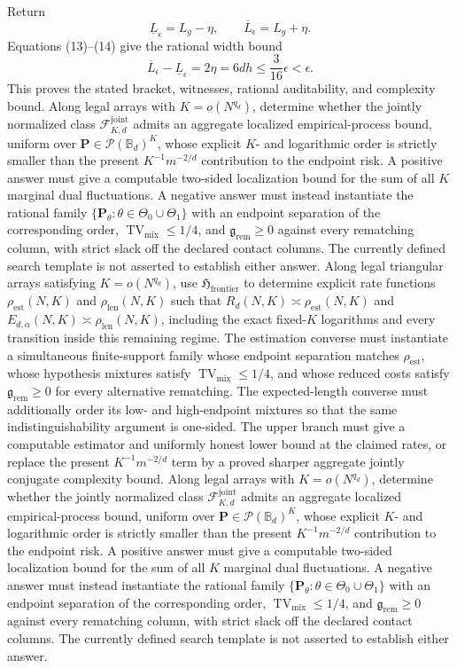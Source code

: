 Return
\[
\underline L_\epsilon=L_g-\eta,
\qquad
\overline L_\epsilon=L_g+\eta.
\]
Equations (13)--(14) give the rational width bound
\[
\overline L_\epsilon-\underline L_\epsilon
=2\eta=6dh\le\frac{3}{16}\epsilon<\epsilon.
\]
This proves the stated bracket, witnesses, rational auditability, and complexity bound.
Along legal arrays with \(K=o(N^{q_d})\), determine whether the jointly normalized class \(\mathcal F_{K,d}^{\mathrm{joint}}\) admits an aggregate localized empirical-process bound, uniform over \(\mathbf P\in\mathcal P(\mathbb B_d)^K\), whose explicit \(K\)- and logarithmic order is strictly smaller than the present \(K^{-1}m^{-2/d}\) contribution to the endpoint risk. A positive answer must give a computable two-sided localization bound for the sum of all \(K\) marginal dual fluctuations. A negative answer must instead instantiate the rational family \(\{\mathbf P_\theta:\theta\in\Theta_0\cup\Theta_1\}\) with an endpoint separation of the corresponding order, \(\operatorname{TV}_{\mathrm{mix}}\le1/4\), and \(\mathfrak g_{\mathrm{rem}}\ge0\) against every rematching column, with strict slack off the declared contact columns. The currently defined search template is not asserted to establish either answer.
Along legal triangular arrays satisfying \(K=o(N^{q_d})\), use \(\mathfrak H_{\mathrm{frontier}}\) to determine explicit rate functions \(\rho_{\mathrm{est}}(N,K)\) and \(\rho_{\mathrm{len}}(N,K)\) such that \(R_d(N,K)\asymp\rho_{\mathrm{est}}(N,K)\) and \(E_{d,\alpha}(N,K)\asymp\rho_{\mathrm{len}}(N,K)\), including the exact fixed-\(K\) logarithms and every transition inside this remaining regime. The estimation converse must instantiate a simultaneous finite-support family whose endpoint separation matches \(\rho_{\mathrm{est}}\), whose hypothesis mixtures satisfy \(\operatorname{TV}_{\mathrm{mix}}\le1/4\), and whose reduced costs satisfy \(\mathfrak g_{\mathrm{rem}}\ge0\) for every alternative rematching. The expected-length converse must additionally order its low- and high-endpoint mixtures so that the same indistinguishability argument is one-sided. The upper branch must give a computable estimator and uniformly honest lower bound at the claimed rates, or replace the present \(K^{-1}m^{-2/d}\) term by a proved sharper aggregate jointly conjugate complexity bound.
Along legal arrays with \(K=o(N^{q_d})\), determine whether the jointly normalized class \(\mathcal F_{K,d}^{\mathrm{joint}}\) admits an aggregate localized empirical-process bound, uniform over \(\mathbf P\in\mathcal P(\mathbb B_d)^K\), whose explicit \(K\)- and logarithmic order is strictly smaller than the present \(K^{-1}m^{-2/d}\) contribution to the endpoint risk. A positive answer must give a computable two-sided localization bound for the sum of all \(K\) marginal dual fluctuations. A negative answer must instead instantiate the rational family \(\{\mathbf P_\theta:\theta\in\Theta_0\cup\Theta_1\}\) with an endpoint separation of the corresponding order, \(\operatorname{TV}_{\mathrm{mix}}\le1/4\), and \(\mathfrak g_{\mathrm{rem}}\ge0\) against every rematching column, with strict slack off the declared contact columns. The currently defined search template is not asserted to establish either answer.
